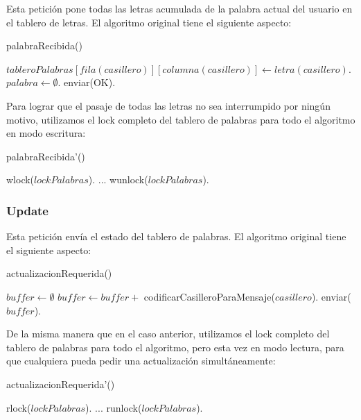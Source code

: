 Esta petición pone todas las letras acumulada de la palabra actual del usuario en el tablero de letras. El algoritmo original tiene el siguiente aspecto:

\begin{algorithm}[H]
\caption{palabraRecibida()}
\begin{algorithmic}[1]
        \STATE $tableroPalabras[fila(casillero)][columna(casillero)] \leftarrow letra(casillero)$.
    \ENDFOR
    \STATE $palabra \leftarrow \emptyset$.
    \STATE enviar(OK).
\end{algorithmic}
\end{algorithm}

\noindent Para lograr que el pasaje de todas las letras no sea interrumpido por ningún motivo, utilizamos el lock completo del tablero de palabras para todo el algoritmo en modo escritura:

\begin{algorithm}[H]
\caption{palabraRecibida'()}
\begin{algorithmic}[1]
    \STATE wlock($lockPalabras$).
    \STATE ...
    \STATE wunlock($lockPalabras$).
\end{algorithmic}
\end{algorithm}

\subsubsection{Update}

Esta petición envía el estado del tablero de palabras. El algoritmo original tiene el siguiente aspecto:

\begin{algorithm}[H]
\caption{actualizacionRequerida()}
\begin{algorithmic}[1]
    \STATE $buffer \leftarrow \emptyset$
        \STATE $buffer \leftarrow buffer +$ codificarCasilleroParaMensaje($casillero$).
    \ENDFOR
    \STATE enviar($buffer$).
\end{algorithmic}
\end{algorithm}

\noindent De la misma manera que en el caso anterior, utilizamos el lock completo del tablero de palabras para todo el algoritmo, pero esta vez en modo lectura, para que cualquiera pueda pedir una actualización simultáneamente:

\begin{algorithm}[H]
\caption{actualizacionRequerida'()}
\begin{algorithmic}[1]
    \STATE rlock($lockPalabras$).
    \STATE ...
    \STATE runlock($lockPalabras$).
\end{algorithmic}
\end{algorithm}